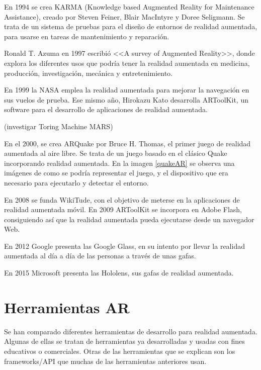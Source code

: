 En 1994 se crea KARMA (Knowledge based Augmented Reality for Maintenance Assistance), creado por  Steven Feiner, Blair MacIntyre y Doree Seligmann. Se trata de un sistema de pruebas para el diseño de entornos de realidad aumentada, para usarse en tareas de mantenimiento y reparación.

Ronald T. Azuma  en 1997 escribió <<A survey of Augmented Reality>>\cite{azuma1997survey}, donde explora los diferentes usos que podría tener la realidad aumentada en medicina, producción, investigación, mecánica y entretenimiento.

En 1999 la NASA emplea la realidad aumentada para mejorar la navegación en sus vuelos de prueba. Ese mismo año, Hirokazu Kato desarrolla ARToolKit, un software para el desarrollo de aplicaciones de realidad aumentada.

(investigar Toring Machine MARS)

En el 2000, se crea ARQuake por Bruce H. Thomas, el primer juego de realidad aumentada al aire libre. Se trata de un juego basado en el clásico Quake incorporando realidad aumentada. En la imagen \ref{quakeAR} se observa una imágenes de como se podría representar el juego, y el dispositivo que era necesario para ejecutarlo y detectar el entorno.

\label{quakeAR}

En 2008 se funda WikiTude, con el objetivo de meterse en la aplicaciones de realidad aumentada móvil. 
En 2009 ARToolKit se incorpora en Adobe Flash, consiguiendo así que la realidad aumentada pueda ejecutarse desde un navegador Web.

En 2012 Google presenta las Google Glass, en su intento por llevar la realidad aumentada al día a día de las personas a través de unas gafas.  

En 2015 Microsoft presenta las Hololens, sus gafas de realidad aumentada.


\section{Herramientas AR}

Se han comparado diferentes herramientas de desarrollo para realidad aumentada. 
Algunas de ellas se tratan de herramientas ya desarrolladas y usadas con fines educativos o comerciales. Otras de las herramientas que se explican son los frameworks/API que muchas de las herramientas anteriores usan.
 

